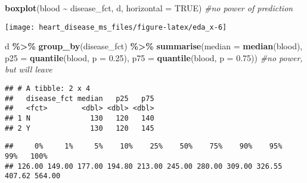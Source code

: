 \documentclass[
]{article}
\newenvironment{Shaded}{\begin{snugshade}}{\end{snugshade}}
\newcommand{\AttributeTok}[1]{\textcolor[rgb]{0.13,0.29,0.53}{#1}}
\newcommand{\CommentTok}[1]{\textcolor[rgb]{0.56,0.35,0.01}{\textit{#1}}}
\newcommand{\ConstantTok}[1]{\textcolor[rgb]{0.56,0.35,0.01}{#1}}
\newcommand{\FloatTok}[1]{\textcolor[rgb]{0.00,0.00,0.81}{#1}}
\newcommand{\FunctionTok}[1]{\textcolor[rgb]{0.13,0.29,0.53}{\textbf{#1}}}
\newcommand{\NormalTok}[1]{#1}
\newcommand{\SpecialCharTok}[1]{\textcolor[rgb]{0.81,0.36,0.00}{\textbf{#1}}}
\begin{document}
\begin{Shaded}
\begin{Highlighting}[]
\FunctionTok{boxplot}\NormalTok{(blood }\SpecialCharTok{\textasciitilde{}}\NormalTok{ disease\_fct, d, }\AttributeTok{horizontal =} \ConstantTok{TRUE}\NormalTok{) }\CommentTok{\#no power of prediction }
\end{Highlighting}
\end{Shaded}

\begin{center}\texttt{[image: heart\_disease\_ms\_files/figure-latex/eda\_x-6]} \end{center}

\begin{Shaded}
\begin{Highlighting}[]
\NormalTok{d }\SpecialCharTok{\%\textgreater{}\%}
  \FunctionTok{group\_by}\NormalTok{(disease\_fct) }\SpecialCharTok{\%\textgreater{}\%}
  \FunctionTok{summarise}\NormalTok{(}\AttributeTok{median =} \FunctionTok{median}\NormalTok{(blood),}
            \AttributeTok{p25 =} \FunctionTok{quantile}\NormalTok{(blood, }\AttributeTok{p =} \FloatTok{0.25}\NormalTok{),}
            \AttributeTok{p75 =} \FunctionTok{quantile}\NormalTok{(blood, }\AttributeTok{p =} \FloatTok{0.75}\NormalTok{)) }\CommentTok{\#no power, but will leave}
\end{Highlighting}
\end{Shaded}

\begin{verbatim}
## # A tibble: 2 x 4
##   disease_fct median   p25   p75
##   <fct>        <dbl> <dbl> <dbl>
## 1 N              130   120   140
## 2 Y              130   120   145
\end{verbatim}

\begin{Shaded}
\end{Shaded}

\begin{verbatim}
##     0%     1%     5%    10%    25%    50%    75%    90%    95%    99%   100% 
## 126.00 149.00 177.00 194.80 213.00 245.00 280.00 309.00 326.55 407.62 564.00
\end{verbatim}
\end{document}
